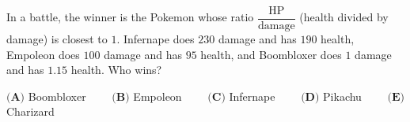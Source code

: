 In a battle, the winner is the Pokemon whose ratio $\dfrac{\text{HP}}{\text{damage}}$ (health divided by damage) is closest to $1$. Infernape does $230$ damage and has $190$ health, Empoleon does $100$ damage and has $95$ health, and Boombloxer does $1$ damage and has $1.15$ health. Who wins?

$\textbf{(A)}$ Boombloxer $\qquad\textbf{(B)}$ Empoleon $\qquad\textbf{(C)}$ Infernape $\qquad\textbf{(D)}$ Pikachu $\qquad\textbf{(E)}$ Charizard
